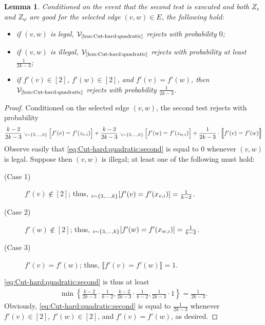 \documentclass[11pt,fleqn]{article}
\newcommand{\V}{\calV}
\newcommand{\f}{f}
\newcommand{\Vquad}{\V_{\text{\ref{lem:Cut-hard:quadratic}}}}
\newcommand{\calV}{\mathcal{V}}
\let\Pr\relax\DeclareMathOperator*{\Pr}{\mathbb{P}}
\newtheorem{lemma}[theorem]{Lemma}
\theoremstyle{definition}
\numberwithin{equation}{section}
\begin{document}
\begin{lemma}
\label{lem:Cut-hard:quadratic:second}
Conditioned on the event that
the second test is executed and
both $Z_v$ and $Z_w$ are good for the selected edge $(v,w) \in E$,
the following hold\textup{:}
    \begin{itemize}
    \item if $(v,w)$ is legal, $\Vquad$ rejects with probability $0$\textup{;}
    
    \item if $(v,w)$ is illegal, $\Vquad$ rejects with probability at least $\frac{1}{2k-3}$\textup{;}
    
    \item if $\f'(v) \in [2]$, $\f'(w) \in [2]$, and $\f'(v) = \f'(w)$,
        then $\Vquad$ rejects with probability $\frac{1}{2k-3}$.
    \end{itemize}
\end{lemma}
\begin{proof} Conditioned on the selected edge $(v,w)$,
    the second test rejects with probability
\begin{align}
\label{eq:Cut-hard:quadratic:second}
\begin{aligned}
          \frac{k-2}{2k-3} \cdot \Pr_{i \sim \{3,\ldots,k\}}\Bigl[ \f'(v) = \f'(z_{v,i}) \Bigr]
        + \frac{k-2}{2k-3} \cdot \Pr_{i \sim \{3,\ldots,k\}}\Bigl[ \f'(w) = \f'(z_{w,i}) \Bigr]
        + \frac{1}{2k-3} \cdot \Bigl\llbracket \f'(v) = \f'(w) \Bigr\rrbracket
\end{aligned}
\end{align}
Observe easily that \cref{eq:Cut-hard:quadratic:second} is equal to $0$ whenever $(v,w)$ is legal.
Suppose then $(v,w)$ is illegal; at least one of the following must hold:
\begin{description}
    \item[(Case 1)] $\f'(v) \notin [2]$; thus,
        $\Pr_{i \sim \{3,\ldots,k\}}[ \f'(v) = \f'(x_{v,i}) ] = \frac{1}{k-2}$.
    \item[(Case 2)] $\f'(w) \notin [2]$; thus,
        $\Pr_{i \sim \{3,\ldots,k\}}[ \f'(w) = \f'(x_{w,i}) ] = \frac{1}{k-2}$.
    \item[(Case 3)] $\f'(v) = \f'(w)$; thus,
        $\llbracket \f'(v) = \f'(w) \rrbracket = 1$.
\end{description}
\cref{eq:Cut-hard:quadratic:second} is thus at least
\begin{align}
    \min\left\{
        \frac{k-2}{2k-3} \cdot \frac{1}{k-2},
        \frac{k-2}{2k-3} \cdot \frac{1}{k-2},
        \frac{1}{2k-3} \cdot 1
    \right\} = \frac{1}{2k-3}.
\end{align}
Obviously,
\cref{eq:Cut-hard:quadratic:second} is equal to $\frac{1}{2k-3}$
whenever $\f'(v) \in [2]$, $\f'(w) \in [2]$, and $\f'(v) = \f'(w)$,
as desired.
\end{proof}
\end{document}
